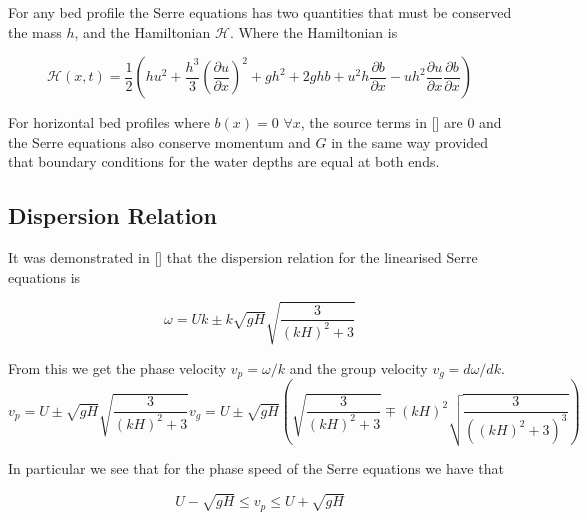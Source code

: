 For any bed profile the Serre equations has two quantities that must be conserved the mass $h$, and the Hamiltonian $\mathcal{H}$. Where the Hamiltonian is

\begin{defn}
	\label{eqn:Hamildef}
	\begin{equation*}
		\mathcal{H}(x,t) = \frac{1}{2} \left(hu^2 + \frac{h^3}{3} \left(\frac{\partial u}{\partial x}\right)^2 + gh^2 + 2ghb + u^2h\frac{\partial b}{\partial x} - uh^2 \frac{\partial u}{\partial x} \frac{\partial b}{\partial x}  \right)
	\end{equation*}

\end{defn}

For horizontal bed profiles where $b(x) = 0$  $\forall x$, the source terms in [] are $0$ and the Serre equations also conserve momentum and $G$ in the same way provided that boundary conditions for the water depths are equal at both ends.


\subsection{Dispersion Relation}
It was demonstrated in [] that the dispersion relation for the linearised Serre equations is

\begin{equation}
\label{eqn:DispersionRelation}
\omega = Uk \pm k \sqrt{gH} \sqrt{\frac{3}{\left(kH\right)^2 + 3}}
\end{equation}

From this we get the phase velocity $v_p = \omega / k$ and the group velocity $v_g = d \omega / d k$.
\begin{subequations}
	\label{eqn:WaveVelocities}
	\begin{equation}
	\label{eqn:WaveVelocitiesPhase}
	v_p = U \pm \sqrt{gH}\sqrt{\frac{3}{\left(kH\right)^2 + 3}}
	\end{equation}
	\begin{equation}
	\label{eqn:WaveVelocitiesGroup}
	v_g = U \pm \sqrt{gH} \left(\sqrt{\frac{3}{\left(kH\right)^2 + 3}} \mp \left(kH\right)^2 \sqrt{\frac{3}{\left(\left(kH\right)^2 + 3 \right)^3}}\right)
	\end{equation}
\end{subequations}

In particular we see that for the phase speed of the Serre equations we have that

\begin{equation}
\label{eqn:WaveVelocitiesBound}
U - \sqrt{gH} \le v_p \le U + \sqrt{gH}
\end{equation}



